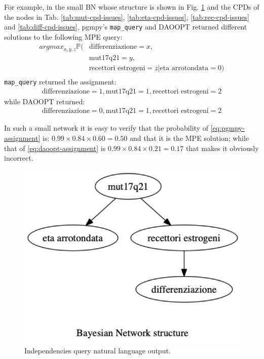 For example, in the small BN whose structure is shown in Fig. \ref{fig:issues-bn} and the CPDs of the nodes in Tab. \ref{tab:mut-cpd-issues}, \ref{tab:eta-cpd-issues}, \ref{tab:rec-cpd-issues} and \ref{tab:diff-cpd-issues}, pgmpy's \texttt{map\_query} and DAOOPT returned different solutions to the following MPE query:
\begin{align*}
  argmax_{x,y,z}\mathbb{P}(
  &\text{differenziazione}=x, \\
  &\text{mut17q21}=y, \\
  &\text{recettori estrogeni}=z | \text{eta arrotondata}=0) \\
\end{align*}
\texttt{map\_query} returned the assignment: 
\begin{align} \label{eq:pgmpy-assignment}
  \text{differenziazione}=1, 
  \text{mut17q21}=1, 
  \text{recettori estrogeni}=2
\end{align}
while DAOOPT returned:
\begin{align} \label{eq:daoopt-assignment}
  \text{differenziazione}=0, 
  \text{mut17q21}=1, 
  \text{recettori estrogeni}=2
\end{align}

In such a small network it is easy to verify that the probability of \ref{eq:pgmpy-assignment} is: $0.99 \times 0.84 \times 0.60 = 0.50$ and that it is the MPE solution; while that of \ref{eq:daoopt-assignment} is $0.99 \times 0.84 \times 0.21 = 0.17$ that makes it obviously incorrect.

\begin{figure}[htbp]
\centerline{\includegraphics[width=\columnwidth/2]{results/images/issues-bn}}
\caption{Independencies query natural language output.}
\label{fig:issues-bn}
\end{figure}

